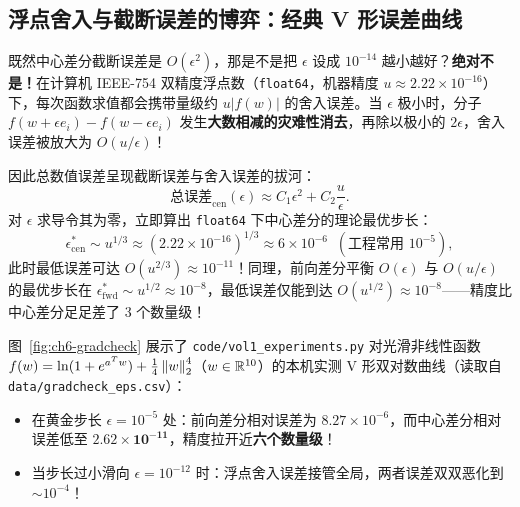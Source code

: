 \subsection{浮点舍入与截断误差的博弈：经典 V 形误差曲线}

既然中心差分截断误差是 $O(\epsilon^2)$，那是不是把 $\epsilon$ 设成 $10^{-14}$ 越小越好？\textbf{绝对不是！}在计算机 IEEE-754 双精度浮点数（\texttt{float64}，机器精度 $u \approx 2.22\times 10^{-16}$）下，每次函数求值都会携带量级约 $u|f(w)|$ 的舍入误差。当 $\epsilon$ 极小时，分子 $f(w+\epsilon e_i) - f(w-\epsilon e_i)$ 发生\textbf{大数相减的灾难性消去}，再除以极小的 $2\epsilon$，舍入误差被放大为 $O(u/\epsilon)$！

因此总数值误差呈现截断误差与舍入误差的拔河：
\[
  \text{总误差}_{\text{cen}}(\epsilon) \approx C_1 \epsilon^2 + C_2 \frac{u}{\epsilon}.
\]
对 $\epsilon$ 求导令其为零，立即算出 \texttt{float64} 下中心差分的理论最优步长：
\[
  \epsilon^*_{\text{cen}} \sim u^{1/3} \approx (2.22\times 10^{-16})^{1/3} \approx 6\times 10^{-6} \;\;(\text{工程常用 } 10^{-5}),
\]
此时最低误差可达 $O(u^{2/3}) \approx 10^{-11}$！同理，前向差分平衡 $O(\epsilon)$ 与 $O(u/\epsilon)$ 的最优步长在 $\epsilon^*_{\text{fwd}} \sim u^{1/2} \approx 10^{-8}$，最低误差仅能到达 $O(u^{1/2}) \approx 10^{-8}$——精度比中心差分足足差了 3 个数量级！

图~\ref{fig:ch6-gradcheck} 展示了 \texttt{code/vol1\_experiments.py} 对光滑非线性函数 $f(w) = \ln(1 + e^{a^T w}) + \frac{1}{4}\left\|w\right\|_2^4$（$w\in\mathbb{R}^{10}$）的本机实测 V 形双对数曲线（读取自 \texttt{data/gradcheck\_eps.csv}）：
\begin{itemize}
  \item 在黄金步长 $\epsilon = 10^{-5}$ 处：前向差分相对误差为 $8.27\times 10^{-6}$，而中心差分相对误差低至 $\mathbf{2.62\times 10^{-11}}$，精度拉开近\textbf{六个数量级}！
  \item 当步长过小滑向 $\epsilon = 10^{-12}$ 时：浮点舍入误差接管全局，两者误差双双恶化到 $\sim 10^{-4}$！
\end{itemize}

